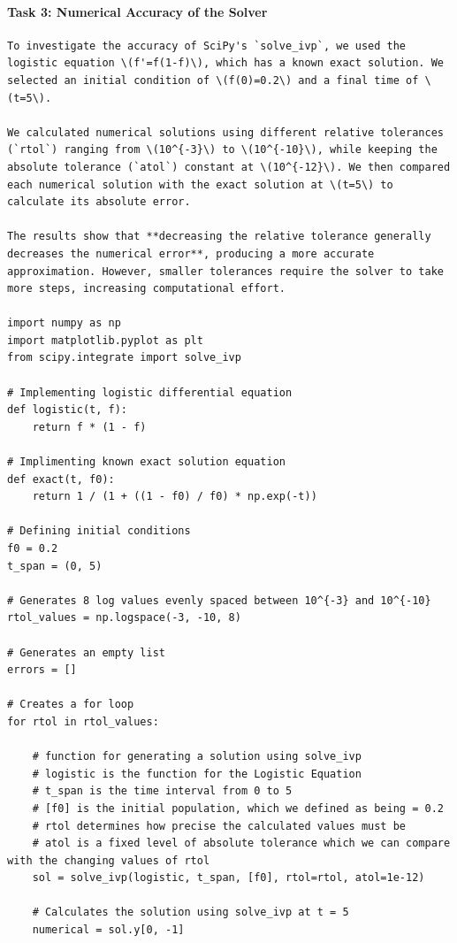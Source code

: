 \documentclass[11pt]{article}
\begin{document}
\paragraph{Task 3: Numerical Accuracy of the Solver}
\begin{verbatim}
To investigate the accuracy of SciPy's `solve_ivp`, we used the logistic equation \(f'=f(1-f)\), which has a known exact solution. We selected an initial condition of \(f(0)=0.2\) and a final time of \(t=5\).

We calculated numerical solutions using different relative tolerances (`rtol`) ranging from \(10^{-3}\) to \(10^{-10}\), while keeping the absolute tolerance (`atol`) constant at \(10^{-12}\). We then compared each numerical solution with the exact solution at \(t=5\) to calculate its absolute error.

The results show that **decreasing the relative tolerance generally decreases the numerical error**, producing a more accurate approximation. However, smaller tolerances require the solver to take more steps, increasing computational effort.

import numpy as np
import matplotlib.pyplot as plt
from scipy.integrate import solve_ivp

# Implementing logistic differential equation
def logistic(t, f):
    return f * (1 - f)

# Implimenting known exact solution equation
def exact(t, f0):
    return 1 / (1 + ((1 - f0) / f0) * np.exp(-t))

# Defining initial conditions
f0 = 0.2
t_span = (0, 5)

# Generates 8 log values evenly spaced between 10^{-3} and 10^{-10}
rtol_values = np.logspace(-3, -10, 8)

# Generates an empty list
errors = []

# Creates a for loop
for rtol in rtol_values:

    # function for generating a solution using solve_ivp
    # logistic is the function for the Logistic Equation
    # t_span is the time interval from 0 to 5
    # [f0] is the initial population, which we defined as being = 0.2
    # rtol determines how precise the calculated values must be
    # atol is a fixed level of absolute tolerance which we can compare with the changing values of rtol
    sol = solve_ivp(logistic, t_span, [f0], rtol=rtol, atol=1e-12)

    # Calculates the solution using solve_ivp at t = 5
    numerical = sol.y[0, -1]


\end{verbatim}
\end{document}
